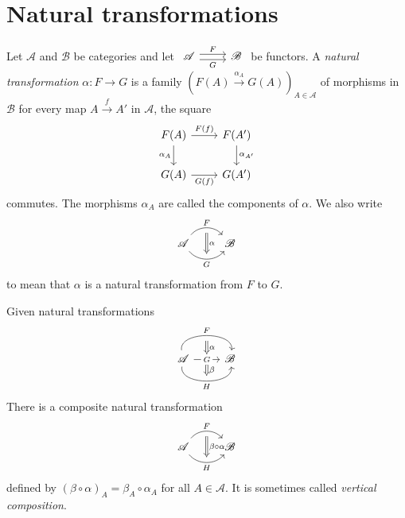 \section{Natural transformations}

\begin{definition}
  Let $\mathscr{A}$ and $\mathscr{B}$ be categories and let $
  \begin{tikzcd}
    \mathscr{A}\arrow[r, shift left, "F"] \arrow[r, shift right, "G"']&\mathscr{B}  
  \end{tikzcd}
  $ be functors.
  A \textit{natural transformation} $\alpha:F\to G$ is a family $\left( F(A)\xrightarrow{\alpha_A} G(A) \right) _{A\in \mathscr{A}}$ of morphisms in $\mathscr{B}$ for every map $A\xrightarrow{f} A'$ in  $\mathscr{A}$, the square
  \begin{equation}
    \begin{tikzcd}
      F(A)\arrow[r, "F(f)"] \arrow[d, "\alpha_{A}"']  & F(A') \arrow[d, "\alpha_{A'}" ]\\
      G(A)\arrow[r, "G(f)"'] & G(A') 
    \end{tikzcd}
  \end{equation}
  commutes. The morphisms $\alpha_A$ are called the components of $\alpha$. We also write
  \[
  \begin{tikzcd}
    \mathscr{A}\arrow[r, bend left=50, "F",""{name=U, below}]\arrow[r, bend right=50, "G"', ""{name=D}]& \mathscr{B} \arrow[Rightarrow, "\alpha", from=U, to=D]   
  \end{tikzcd}
  \] 
  to mean that $\alpha$ is a natural transformation from $F$ to $G$.
\end{definition}

Given natural transformations
\[
\begin{tikzcd}
  \mathscr{A}\arrow[r, bend left=100, "F", ""{name=U,below}]\arrow[r, "G" description, ""{name=M},""{name=MD,below}]\arrow[r, bend right=100, "H"', ""{name=D}]  & \mathscr{B}\arrow[Rightarrow, "\alpha", from=U, to=M] \arrow[Rightarrow, "\beta", from=MD,to=D]   
\end{tikzcd}
\]
There is a composite natural transformation
  \[
  \begin{tikzcd}
    \mathscr{A}\arrow[r, bend left=50, "F",""{name=U, below}]\arrow[r, bend right=50, "H"', ""{name=D}]& \mathscr{B} \arrow[Rightarrow, "\beta\circ\alpha", from=U, to=D]   
  \end{tikzcd}
  \] 
  defined by $(\beta\circ\alpha)_{A}=\beta_{A}\circ \alpha_A$ for all $A \in \mathscr{A}$. It is sometimes called \textit{vertical composition}. 

